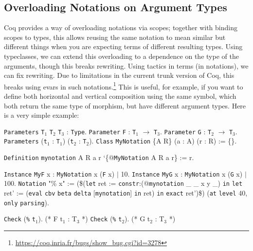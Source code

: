 \documentclass{article}
\makeatletter
\gdef\@makeopenbrace<\catcode`{>
\gdef\@makeclosebrace<\catcode`}>
\newcommand{\processcommands}[1]{{%
  \catcode`\\=0\relax
  \@makeopenbrace=1\relax
  \@makeclosebrace=2\relax
  \def\{{\texttt{\mytextbraceleft}}
  \def\}{\texttt{\mytextbraceright}}
  \scantokens{#1}%
}}
\newcommand{\processcommandsinverbatimline}{\expandafter\processcommands\expandafter{\the\verbatim@line}}
\newenvironment{coqcode}{\begingroup
  \vspace{0.5\baselineskip}
  \let\trivlist\relax
  \let\endtrivlist\relax
  \let\item\relax
  \setlength{\parsep}{0pt}%
  \setlength{\parskip}{0pt}%
  \setlength{\topsep}{0pt}%
  \setlength{\@topsepadd}{0pt}%
  \setlength{\partopsep}{0pt}%
  \setlength{\@topsep}{0pt}%
  \let\old@@par\@@par
  \let\@@par\relax
  \let\old@vskip\vskip
  \let\vskip\relax
  \verbatim
  \let\@@par\old@@par
  \let\vskip\old@vskip
  \let\verbatim@processline=\processcommandsinverbatimline
}{\endverbatim\endgroup\vspace{0.5\baselineskip}}
\newcommand{\coqdockw}[1]{\texttt {\textcolor{kwred}{#1}}}
\newcommand{\coqdocvar}[1]{\textcolor{varpurple}{#1}}
\newcommand{\coqdoccst}[1]{\texttt{\textcolor{defgreen}{#1}}}%
\newcommand{\coqdocax}[1]{\texttt {\textcolor{indblue}{#1}}}
\newcommand{\coqdocind}[1]{\texttt{\textcolor{indblue}{#1}}}%
\newcommand{\coqdoctac}[1]{\texttt{#1}}
\newcommand{\coqdocdefinition}[1]{\coqdoccst{#1}}
\newcommand{\coqdocclass}[1]{\coqdocind{#1}}
\newcommand{\coqdocinstance}[1]{\coqdoccst{#1}}
\newcommand{\coqdocrecord}[1]{\coqdocind{#1}}
\newcommand{\coqdocnotation}[1]{\coqdockw{#1}}
\newcommand{\coqdocaxiom}[1]{\coqdocax{#1}}
\makeatother
\begin{document}
\subsection{Overloading Notations on Argument Types}
Coq provides a way of overloading notations via scopes; together with binding scopes to types, this allows reusing the same notation to mean similar but different things when you are expecting terms of different resulting types.  Using typeclasses, we can extend this overloading to a dependence on the type of the arguments, though this breaks rewriting.  Using tactics in terms (in notations), we can fix rewriting.  Due to limitations in the current trunk version of Coq, this breaks using evars in such notations.\footnote{\url{https://coq.inria.fr/bugs/show\_bug.cgi?id=3278}}  This is useful, for example, if you want to define both horizontal and vertical composition using the same symbol, which both return the same type of morphism, but have different argument types.  Here is a very simple example:

\newcommand{\Ts}[1]{T\ensuremath{_#1}}
\newcommand{\ts}[1]{t\ensuremath{_#1}}
\begin{coqcode}
\coqdockw{Parameters} \coqdocaxiom{\Ts1} \coqdocaxiom{\Ts2} \coqdocaxiom{\Ts3} : \coqdockw{Type}.
\coqdockw{Parameter} \coqdocaxiom{F} : \coqdocaxiom{\Ts1} \coqdocnotation{\ensuremath{\rightarrow}} \coqdocaxiom{\Ts3}.
\coqdockw{Parameter} \coqdocaxiom{G} : \coqdocaxiom{\Ts2} \coqdocnotation{\ensuremath{\rightarrow}} \coqdocaxiom{\Ts3}.
\coqdockw{Parameters} (\coqdocaxiom{\ts1} : \coqdocaxiom{\Ts1}) (\coqdocaxiom{\ts2} : \coqdocaxiom{\Ts2}).
\vspace{0em}
\coqdockw{Class} \coqdocrecord{MyNotation} \{\coqdocvar{A} \coqdocvar{R}\} (\coqdocvar{a} : \coqdocvar{A}) (\coqdocvar{r} : \coqdocvar{R}) := \{\}.

\coqdockw{Definition} \coqdocdefinition{mynotation} \coqdocvar{A} \coqdocvar{R} \coqdocvar{a} \coqdocvar{r} `\{@\coqdocclass{MyNotation} \coqdocvar{A} \coqdocvar{R} \coqdocvar{a} \coqdocvar{r}\} := \coqdocvar{r}.

\coqdockw{Instance} \coqdocinstance{MyF} \coqdocvar{x} : \coqdocclass{MyNotation} \coqdocvar{x} (\coqdocaxiom{F} \coqdocvar{x}) \ensuremath{|} 10.
\coqdockw{Instance} \coqdocinstance{MyG} \coqdocvar{x} : \coqdocclass{MyNotation} \coqdocvar{x} (\coqdocaxiom{G} \coqdocvar{x}) \ensuremath{|} 100.
\vspace{0em}
\coqdockw{Notation} "\% x"
    := (\$(\coqdockw{let} \coqdocvar{ret} := \coqdockw{constr}:(@\coqdocdefinition{mynotation} \coqdocvar{_} \coqdocvar{_} \coqdocvar{x} \coqdocvar{y} \coqdocvar{_}) \coqdoctac{in}
          \coqdockw{let} \coqdocvar{ret'} := (\coqdoctac{eval} \coqdoctac{cbv} \coqdockw{beta} \coqdockw{delta} [\coqdocdefinition{mynotation}] \coqdoctac{in} \coqdocvar{ret}) \coqdoctac{in}
          \coqdoctac{exact} \coqdocvar{ret'})\$)
  (\coqdockw{at} \coqdockw{level} 40, \coqdockw{only} \coqdockw{parsing}).

\coqdockw{Check} (\coqdocnotation{\%} \coqdocaxiom{\ts1}). (* F \ts1 : \Ts3 *)
\coqdockw{Check} (\coqdocnotation{\%} \coqdocaxiom{\ts2}). (* G \ts2 : \Ts3 *)
\end{coqcode}
\end{document}
